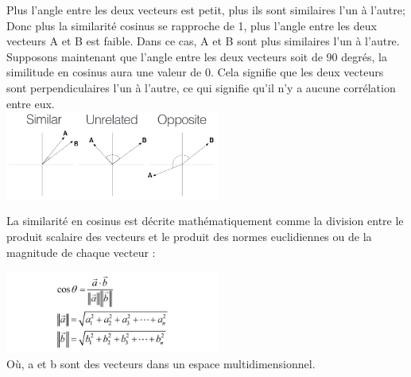 Plus l'angle entre les deux vecteurs est petit, plus ils sont similaires l'un à l'autre; Donc plus la similarité cosinus se rapproche de 1, plus l'angle entre les deux vecteurs A et B est faible. Dans ce cas, A et B sont plus similaires l'un à l'autre.
\\
Supposons maintenant que l'angle entre les deux vecteurs soit de 90 degrés, la similitude en cosinus aura une valeur de 0. Cela signifie que les deux vecteurs sont perpendiculaires l'un à l'autre, ce qui signifie qu'il n'y a aucune corrélation entre eux.
\\
\includegraphics[width=200pt]{./img/notions_math/metric/img_metric_cos.png}


La similarité en cosinus est décrite mathématiquement comme la division entre le produit scalaire des vecteurs et le produit des normes euclidiennes ou de la magnitude de chaque vecteur :


\includegraphics[width=200pt]{./img/notions_math/metric/eq_metric_cos.png}
\\
Où, a et b sont des vecteurs dans un espace multidimensionnel.


